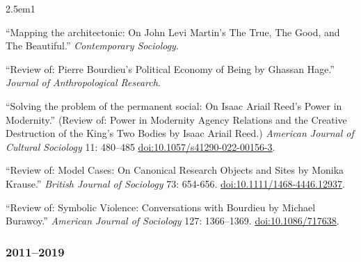 \documentclass[
]{article}
\newenvironment{cventry}{\begin{hangparas}{2.5em}{1}}{\end{hangparas}}
\begin{document}
\begin{cventry}

``Mapping the architectonic: On John Levi Martin's The True, The Good,
and The Beautiful.'' \emph{Contemporary Sociology}.

``Review of: Pierre Bourdieu's Political Economy of Being by Ghassan
Hage.'' \emph{Journal of Anthropological Research}.

``Solving the problem of the permanent social: On Isaac Ariail Reed's
Power in Modernity.'' (Review of: Power in Modernity Agency Relations
and the Creative Destruction of the King's Two Bodies by Isaac Ariail
Reed.) \emph{American Journal of Cultural Sociology} 11: 480--485
\href{https://doi.org/10.1057/s41290-022-00156-3}{doi:10.1057/s41290-022-00156-3}.

``Review of: Model Cases: On Canonical Research Objects and Sites by
Monika Krause.'' \emph{British Journal of Sociology} 73: 654-656.
\href{https://doi.org/10.1111/1468-4446.12937}{doi:10.1111/1468-4446.12937}.

``Review of: Symbolic Violence: Conversations with Bourdieu by Michael
Burawoy.'' \emph{American Journal of Sociology} 127: 1366--1369.
\href{https://doi.org/10.1086/717638}{doi:10.1086/717638}.

\end{cventry}

\subsubsection{2011--2019}\label{section-20}
\end{document}
